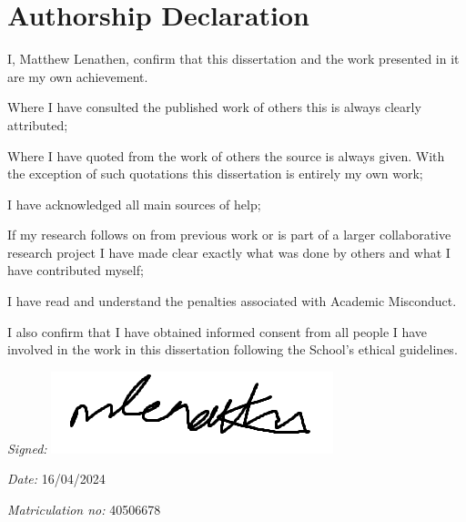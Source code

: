 
\section*{Authorship Declaration}
\vspace{0.5cm}
\begin{flushleft}
I, Matthew Lenathen, confirm that this dissertation and the work presented in it are my own achievement.\newline

Where I have consulted the published work of others this is always clearly attributed;\newline

Where I have quoted from the work of others the source is always given. With the exception of such quotations this dissertation is entirely my own work;\newline

I have acknowledged all main sources of help; \newline

If my research follows on from previous work or is part of a larger collaborative research project I have made clear exactly what was done by others and what I have contributed myself;\newline

I have read and understand the penalties associated with Academic Misconduct.\newline

I also confirm that I have obtained informed consent from all people I have involved in the work in this dissertation following the School's ethical guidelines.\newline
\end{flushleft}

\begin{flushleft} \large
\emph{Signed:} \includegraphics[height=1.5\baselineskip]{figures/sig.png}
\\
\end{flushleft}

\vspace{.5cm}

\begin{flushleft} \large
\emph{Date:} 16/04/2024 
\\
\end{flushleft}

\vspace{.5cm}

\begin{flushleft} \large
\emph{Matriculation no: } 40506678  \\
\end{flushleft}